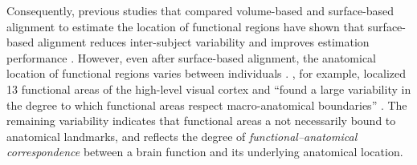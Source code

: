 Consequently, previous studies that compared volume-based and surface-based
alignment to estimate the location of functional regions have shown that
surface-based alignment reduces inter-subject variability and improves
estimation performance \citep{rosenke2021probabilistic, frost2012measuring,
wang2015probabilistic, weiner2018defining}.
However, even after surface-based alignment, the anatomical location of
functional regions varies between individuals \citep{coalson2018impact,
benson2014correction, natu2021sulcal, wang2015probabilistic, frost2012measuring,
langers2014assessment, weiner2014mid, rosenke2021probabilistic}.
\citet{frost2012measuring}, for example, localized 13 functional areas of the
high-level visual cortex and ``found a large variability in the degree to which
functional areas respect macro-anatomical boundaries'' \citep[][p.
1369]{frost2012measuring}.
The remaining variability indicates that functional areas a not necessarily
bound to anatomical landmarks, and reflects the degree of
\textit{functional--anatomical correspondence} between a brain function and its
underlying anatomical location.

